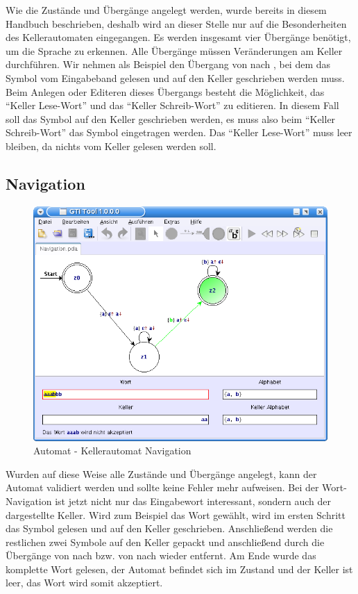 Wie die Zustände und Übergänge angelegt werden, wurde bereits in diesem Handbuch
beschrieben, deshalb wird an dieser Stelle nur auf die Besonderheiten des
Kellerautomaten eingegangen. Es werden insgesamt vier Übergänge benötigt, um die
Sprache zu erkennen. Alle Übergänge müssen Veränderungen am Keller durchführen.
Wir nehmen als Beispiel den Übergang von  nach , bei dem das
Symbol  vom Eingabeband gelesen und auf den Keller geschrieben werden
muss. Beim Anlegen oder Editeren dieses Übergangs besteht die Möglichkeit, das
"`Keller Lese-Wort"' und das "`Keller Schreib-Wort"' zu editieren. In diesem Fall
soll das Symbol  auf den Keller geschrieben werden, es muss also beim
"`Keller Schreib-Wort"' das Symbol  eingetragen werden. Das "`Keller
Lese-Wort"' muss leer bleiben, da nichts vom Keller gelesen werden
soll.\vspace{10pt}


\subsection{Navigation}

\begin{figure}[h]
\begin{center}
\includegraphics[width=12cm]{../images/pda_navigation.png}
\caption{Automat - Kellerautomat Navigation}
\end{center}
\end{figure}

Wurden auf diese Weise alle Zustände und Übergänge angelegt, kann der Automat
validiert werden und sollte keine Fehler mehr aufweisen. Bei der Wort-
Navigation ist jetzt nicht nur das Eingabewort interessant, sondern auch der
dargestellte Keller. Wird zum Beispiel das Wort  gewählt, wird im
ersten Schritt das Symbol  gelesen und auf den Keller geschrieben.
Anschließend werden die restlichen zwei Symbole  auf den Keller
gepackt und anschließend durch die Übergänge von  nach 
bzw. von  nach  wieder entfernt. Am Ende wurde das
komplette Wort  gelesen, der Automat befindet sich im Zustand
 und der Keller ist leer, das Wort wird somit akzeptiert.


